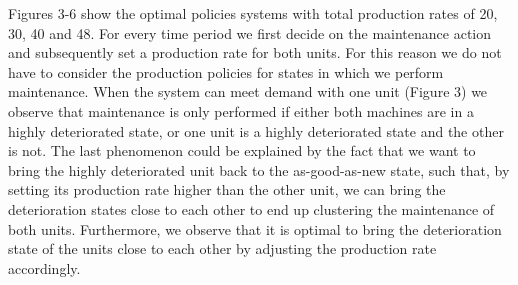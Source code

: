 \documentclass[a4paper,12pt]{article}
\begin{document}
Figures 3-6 show the optimal policies systems with total production rates of 20, 30, 40 and 48. For every time period we first decide on the maintenance action and subsequently set a production rate for both units. For this reason we do not have to consider the production policies for states in which we perform maintenance. When the system can meet demand with one unit (Figure 3) we observe that maintenance is only performed if either both machines are in a highly deteriorated state, or one unit is a highly deteriorated state and the other is not. The last phenomenon could be explained by the fact that we want to bring the highly deteriorated unit back to the as-good-as-new state, such that, by setting its production rate higher than the other unit, we can bring the deterioration states close to each other to end up clustering the maintenance of both units. Furthermore, we observe that it is optimal to bring the deterioration state of the units close to each other by adjusting the production rate accordingly.
\end{document}
